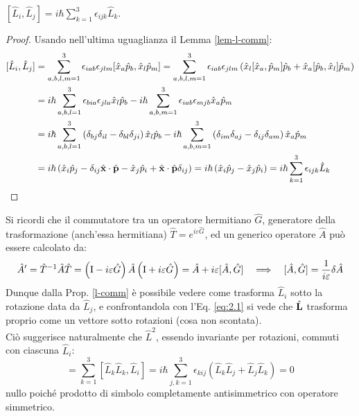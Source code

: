 \begin{proposition}\label{l-comm}
	$ [\hat{L}_i,\hat{L}_j] = i\hbar \sum_{k = 1}^{3} \epsilon_{ijk} \hat{L}_k $.
\end{proposition}
\begin{proof}
	Usando nell'ultima uguaglianza il Lemma \ref{lem-l-comm}:
	\begin{equation*}
		\begin{split}
			[\hat{L}_i,\hat{L}_j]
			&= \sum_{a,b,l,m = 1}^{3} \epsilon_{iab}\epsilon_{jlm} [\hat{x}_a \hat{p}_b,\hat{x}_l \hat{p}_m] = \sum_{a,b,l,m = 1}^{3}  \epsilon_{iab} \epsilon_{jlm} \left( \hat{x}_l [\hat{x}_a,\hat{p}_m] \hat{p}_b + \hat{x}_a [\hat{p}_b,\hat{x}_l] \hat{p}_m \right)\\
			&= i\hbar \sum_{a,b,l = 1}^{3} \epsilon_{bia} \epsilon_{jla} \hat{x}_l \hat{p}_b - i\hbar \sum_{a,b,m = 1}^{3} \epsilon_{iab} \epsilon_{mjb} \hat{x}_a \hat{p}_m\\
			&= i\hbar \sum_{a,b,l = 1}^{3} \left( \delta_{bj}\delta_{il} - \delta_{bl}\delta_{ji} \right) \hat{x}_l \hat{p}_b - i\hbar \sum_{a,b,m = 1}^{3} \left( \delta_{im} \delta_{aj} - \delta_{ij}\delta_{am} \right) \hat{x}_a \hat{p}_m\\
			&= i\hbar \left( \hat{x}_i \hat{p}_j - \delta_{ij} \hat{\mathbf{x}}\cdot\hat{\mathbf{p}} - \hat{x}_j \hat{p}_i + \hat{\mathbf{x}}\cdot\hat{\mathbf{p}} \delta_{ij} \right) = i\hbar \left( \hat{x}_i \hat{p}_j - \hat{x}_j \hat{p}_i \right) = i\hbar \sum_{k = 1}^{3} \epsilon_{ijk} \hat{L}_k
		\end{split}
	\end{equation*}
\end{proof}

Si ricordi che il commutatore tra un operatore hermitiano $ \hat{G} $, generatore della trasformazione (anch'essa hermitiana) $ \hat{T} = e^{i \varepsilon \hat{G}} $, ed un generico operatore $ \hat{A} $ può essere calcolato da:
\begin{equation}
	\hat{A}' = \hat{T}^{-1} \hat{A} \hat{T} = \left( \mathbf{\text{I}} - i\varepsilon\hat{G} \right) \hat{A} \left( \mathbf{\text{I}} + i\varepsilon\hat{G} \right) = \hat{A} + i\varepsilon [\hat{A},\hat{G}] \quad\Longrightarrow\quad [\hat{A},\hat{G}] = \frac{1}{i\varepsilon} \delta\hat{A}
	\label{eq:2.11}
\end{equation}
Dunque dalla Prop. \ref{l-comm} è possibile vedere come trasforma $ \hat{L}_i $ sotto la rotazione data da $ \hat{L}_j $, e confrontandola con l'Eq. \ref{eq:2.1} si vede che $ \hat{\mathbf{L}} $ trasforma proprio come un vettore sotto rotazioni (cosa non scontata).\\
Ciò suggerisce naturalmente che $ \hat{L}^2 $, essendo invariante per rotazioni, commuti con ciascuna $ \hat{L}_i $:
\begin{equation}
	[\hat{L}^2,\hat{L}_i] = \sum_{k = 1}^{3} [\hat{L}_k\hat{L}_k,\hat{L}_i] = i\hbar \sum_{j,k = 1}^{3} \epsilon_{kij} \left( \hat{L}_k\hat{L}_j + \hat{L}_j\hat{L}_k \right) = 0
	\label{eq:2.12}
\end{equation}
nullo poiché prodotto di simbolo completamente antisimmetrico con operatore simmetrico.










